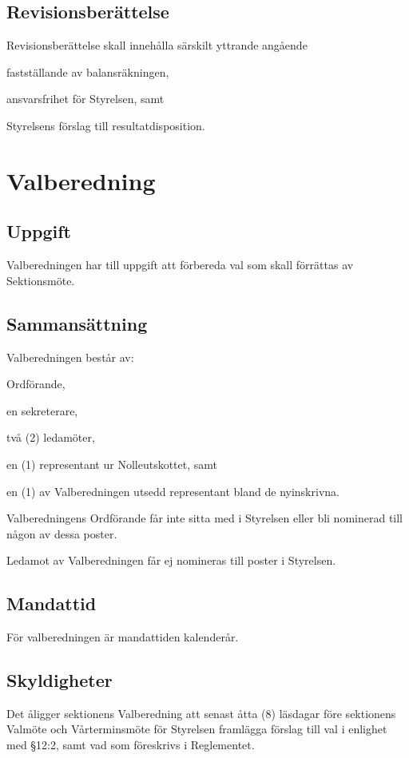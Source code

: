 \documentclass[10pt]{article}
\begin{document}
    \subsection{Revisionsberättelse}
    Revisionsberättelse skall innehålla särskilt yttrande angående
    \begin{alphlist}
    \item fastställande av balansräkningen,
    \item ansvarsfrihet för Styrelsen, samt
    \item Styrelsens förslag till resultatdisposition.
    \end{alphlist}
    \newpage
    
    \section{Valberedning}
    \subsection{Uppgift}
    Valberedningen har till uppgift att förbereda val som skall förrättas av
    Sektionsmöte.
    
    \subsection{Sammansättning}
    Valberedningen består av:
    \begin{alphlist}
    \item Ordförande,
    \item en sekreterare,
    \item två (2) ledamöter,
    \item en (1) representant ur Nolleutskottet,  samt
    \item en (1) av Valberedningen utsedd representant bland de nyinskrivna.
    \end{alphlist}
    
    Valberedningens Ordförande får inte sitta med i Styrelsen eller bli nominerad till någon av dessa poster.
    
    Ledamot av Valberedningen får ej nomineras till poster i Styrelsen.
    
    \subsection{Mandattid}
    För valberedningen är mandattiden kalenderår.
    
    \subsection{Skyldigheter}
    Det åligger sektionens Valberedning att senast åtta (8) läsdagar före
    sektionens Valmöte och Vårterminsmöte för Styrelsen framlägga förslag till
    val i enlighet med §12:2, samt vad som föreskrivs i Reglementet.
    
\end{document}
